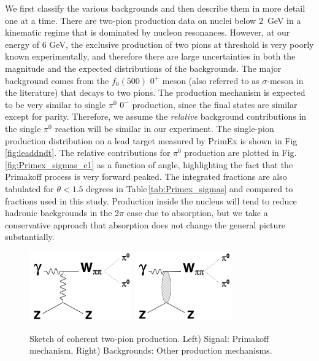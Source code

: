 We first classify the various backgrounds and then describe them in
more detail one at a time. There are two-pion production data on
nuclei below 2~GeV \cite{schadm2005double} in a kinematic regime that
is dominated by nucleon resonances. However, at our energy of 6 GeV,
the exclusive production of two pions at threshold is very poorly
known experimentally, and therefore there are large uncertainties in
both the magnitude and the expected distributions of the backgrounds.
The major background comes from the $f_0(500)$ $0^{+}$ meson (also
referred to as $\sigma$-meson in the literature) that decays to two
pions. The production mechanism is expected to be very similar to
single $\pi^0$ $0^{-}$ production, since the final states are similar
except for parity. Therefore, we assume the {\em relative} background
contributions in the single $\pi^0$ reaction will be similar in our
experiment. The single-pion production distribution on a lead target
measured by PrimEx \cite{Larin:2018} is shown in
Fig\,\ref{fig:leaddndt}. The relative contributions for $\pi^0$
production are plotted in Fig.\,\ref{fig:Primex_sigmas_c1} as a
function of angle, highlighting the fact that the Primakoff process is
very forward peaked. The integrated fractions are also tabulated for
$\theta < 1.5$ degrees in Table\,\ref{tab:Primex_sigmas} and compared
to fractions used in this study.  Production inside the nucleus will
tend to reduce hadronic backgrounds in the 2$\pi$ case due to
absorption, but we take a conservative approach that absorption does
not change the general picture substantially.

 \begin{figure}[tbh]
\begin{center}
\includegraphics[height=3cm,clip=true]{figures/Diagram_Primakoff.png} \hspace{1cm}
\includegraphics[height=3cm,clip=true]{figures/Diagram_hadronic.png}
\caption{Sketch of coherent two-pion production. Left) Signal: Primakoff mechanism, Right) Backgrounds: Other production mechanisms.
\label{fig:Diagram}}
\end{center}
\end{figure}

